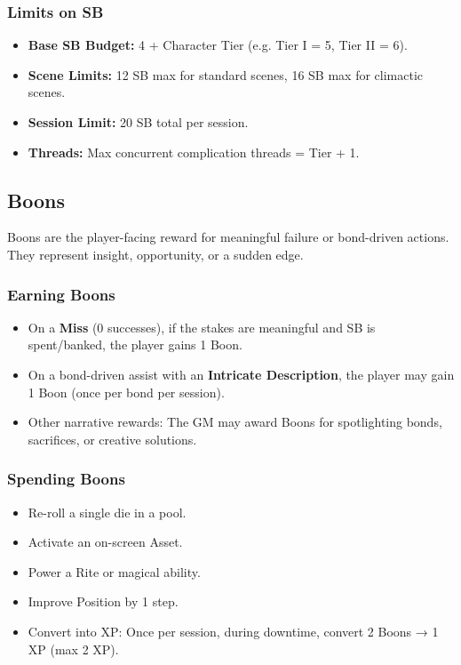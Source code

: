 \subsubsection{Limits on SB}
\begin{itemize}
  \item \textbf{Base SB Budget:} 4 + Character Tier (e.g. Tier I = 5, Tier II = 6).
  \item \textbf{Scene Limits:} 12 SB max for standard scenes, 16 SB max for climactic scenes.
  \item \textbf{Session Limit:} 20 SB total per session.
  \item \textbf{Threads:} Max concurrent complication threads = Tier + 1.
\end{itemize}

\subsection{Boons}
Boons are the player-facing reward for meaningful failure or bond-driven actions. They represent insight, opportunity, or a sudden edge.

\subsubsection{Earning Boons}
\begin{itemize}
  \item On a \textbf{Miss} (0 successes), if the stakes are meaningful and SB is spent/banked, the player gains 1 Boon.
  \item On a bond-driven assist with an \textbf{Intricate Description}, the player may gain 1 Boon (once per bond per session).
  \item Other narrative rewards: The GM may award Boons for spotlighting bonds, sacrifices, or creative solutions.
\end{itemize}

\subsubsection{Spending Boons}
\begin{itemize}
  \item Re-roll a single die in a pool.
  \item Activate an on-screen Asset.
  \item Power a Rite or magical ability.
  \item Improve Position by 1 step.
  \item Convert into XP: Once per session, during downtime, convert 2 Boons → 1 XP (max 2 XP).
\end{itemize}

